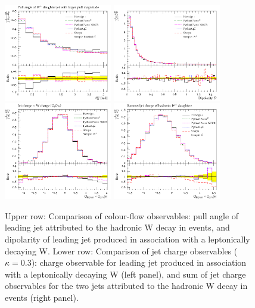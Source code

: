 \begin{figure}[t!]
  \centering
     \includegraphics[width=0.42\textwidth]{MC_CFLOW_TOPBOOST_LargePullAngleToDipoleAxis} 
      \includegraphics[width=0.42\textwidth]{MC_GENSTUDY_JETCHARGE_Dipolarity}
      \includegraphics[width=0.42\textwidth]{MC_GENSTUDY_JETCHARGE_WJetChargeK3}%
      \includegraphics[width=0.42\textwidth]{MC_CFLOW_TTBAR_HadronicWJetChargeSum}
 \caption[]{
 Upper row: Comparison of colour-flow observables: pull angle of leading jet 
 attributed to the hadronic W decay in \ttbar{} events, and 
 dipolarity of leading jet produced in association with a leptonically decaying W.
 Lower row: Comparison of jet charge observables  ($\kappa=0.3$): 
 charge observable for leading jet produced in association with a 
 leptonically decaying W (left panel), and sum of jet charge observables for the 
 two jets attributed to the hadronic W  decay in \ttbar{} events (right panel).
}
  \label{fig:cflow}
\end{figure}



